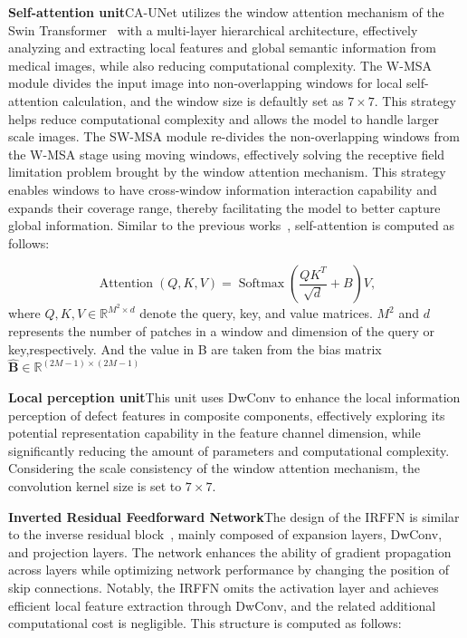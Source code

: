 \textbf{Self-attention unit}\quad CA-UNet utilizes the window attention mechanism of the Swin Transformer~\cite{liu2021swin} with a multi-layer hierarchical architecture, effectively analyzing and extracting local features and global semantic information from medical images, while also reducing computational complexity. The W-MSA module divides the input image into non-overlapping windows for local self-attention calculation, and the window size is defaultly set as $7 \times 7$. This strategy helps reduce computational complexity and allows the model to handle larger scale images. The SW-MSA module re-divides the non-overlapping windows from the W-MSA stage using moving windows, effectively solving the receptive field limitation problem brought by the window attention mechanism. This strategy enables windows to have cross-window information interaction capability and expands their coverage range, thereby facilitating the model to better capture global information.  Similar to the previous works~\cite{raffel2020exploring,bao2020unilmv2,hu2018relation,hu2019local}, self-attention is computed as follows:

\begin{equation}
	\label{eq:swin_attention}
	\operatorname{Attention}(Q, K, V)=\operatorname{Softmax}\left(\frac{Q K^{T}}{\sqrt{d}}+B\right) V,
\end{equation}where $Q,K,V \in \mathbb{R}^{M^2 \times d}$ denote the query, key, and value matrices. $M^2$ and $d$ represents the number of patches in a window and dimension of the query or key,respectively. And the value in B are taken from the bias matrix   $\hat{\pmb{B}} \in \mathbb{R}^{(2 M-1) \times(2 M-1)}$

\textbf{Local perception unit}\quad This unit uses DwConv to enhance the local information perception of defect features in composite components, effectively exploring its potential representation capability in the feature channel dimension, while significantly reducing the amount of parameters and computational complexity. Considering the scale consistency of the window attention mechanism, the convolution kernel size is set to $7 \times 7$.

\textbf{Inverted Residual Feedforward Network}\quad The design of the IRFFN is similar to the inverse residual block~\cite{sandler2018mobilenetv2}, mainly composed of expansion layers, DwConv, and projection layers. The network enhances the ability of gradient propagation across layers while optimizing network performance by changing the position of skip connections. Notably, the IRFFN omits the activation layer and achieves efficient local feature extraction through DwConv, and the related additional computational cost is negligible. This structure is computed as follows:

